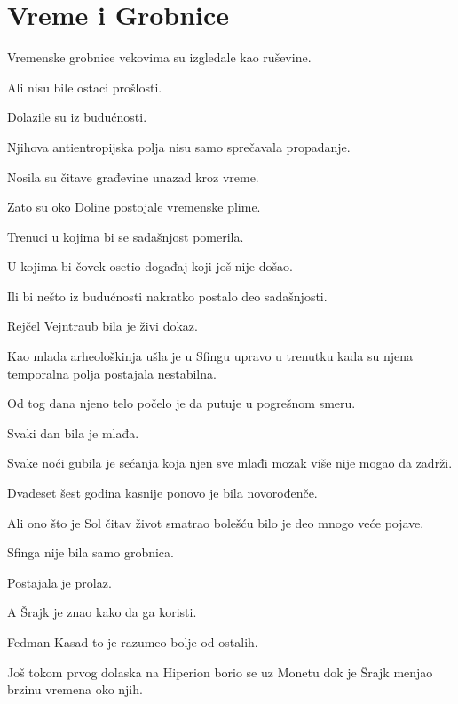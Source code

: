 
\chapter{Vreme i Grobnice}


Vremenske grobnice vekovima su izgledale kao ruševine.

Ali nisu bile ostaci prošlosti.

Dolazile su iz budućnosti.

\bigskip

Njihova antientropijska polja nisu samo sprečavala propadanje.

Nosila su čitave građevine unazad kroz vreme.

Zato su oko Doline postojale vremenske plime.

Trenuci u kojima bi se sadašnjost pomerila.

U kojima bi čovek osetio događaj koji još nije došao.

Ili bi nešto iz budućnosti nakratko postalo deo sadašnjosti.

\bigskip

Rejčel Vejntraub bila je živi dokaz.

Kao mlada arheološkinja ušla je u Sfingu upravo u trenutku kada su njena temporalna polja postajala nestabilna.

Od tog dana njeno telo počelo je da putuje u pogrešnom smeru.

\bigskip

Svaki dan bila je mlađa.

Svake noći gubila je sećanja koja njen sve mlađi mozak više nije mogao da zadrži.

Dvadeset šest godina kasnije ponovo je bila novorođenče.

\bigskip

Ali ono što je Sol čitav život smatrao bolešću bilo je deo mnogo veće pojave.

Sfinga nije bila samo grobnica.

Postajala je prolaz.

\bigskip

A Šrajk je znao kako da ga koristi.

\bigskip

Fedman Kasad to je razumeo bolje od ostalih.

Još tokom prvog dolaska na Hiperion borio se uz Monetu dok je Šrajk menjao brzinu vremena oko njih.


